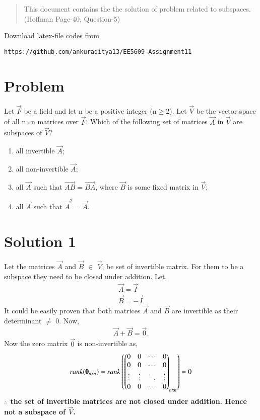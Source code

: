 \documentclass[journal,12pt,twocolumn]{IEEEtran}
\begin{document}
\begin{abstract}
This document contains the the solution of problem related to subspaces.(Hoffman Page-40, Question-5)  
\end{abstract}
Download latex-file codes from 
\begin{lstlisting}
https://github.com/ankuraditya13/EE5609-Assignment11
\end{lstlisting}

\section{Problem}
Let $\vec{F}$ be a field and let n be a positive integer (n$\geq$2). Let $\vec{V}$ be the vector space of all n$\times$n matrices over $\vec{F}$. Which of the following set of matrices $\vec{A}$ in $\vec{V}$ are subspaces of   $\vec{V}$?
\begin{enumerate}
\item all invertible $\vec{A}$;
\item all non-invertible $\vec{A}$;
\item all $\vec{A}$ such that $\vec{AB}=\vec{BA}$, where $\vec{B}$ is some fixed matrix in $\vec{V}$;
\item all $\vec{A}$ such that $\vec{A}^2 = \vec{A}$.
\end{enumerate}
\section{Solution 1}
Let the matrices $\vec{A}$ and $\vec{B}$ $\in$ $\vec{V}$, be set of invertible matrix. For them to be a subspace they need to be closed under addition.
Let,
\begin{align}
\vec{A} = \vec{I}\\
\vec{B} = -\vec{I}
\end{align}  
It could be easily proven that both matrices $\vec{A}$ and $\vec{B}$ are invertible as their determinant $\neq$ 0. Now,
\begin{align}
\vec{A}+\vec{B} = \vec{0}. 
\end{align} 
Now the zero matrix $\vec{0}$ is non-invertible as,
\begin{align}
rank(\mathbf{0}_{nxn}) = rank\left(\begin{pmatrix}0&0&\cdots&0\\0&0&\cdots&0\\\vdots&\vdots&\ddots&\vdots\\0&0&\cdots&0\end{pmatrix}_{nxn}\right)= 0
\end{align} 
\textbf{$\therefore$ the set of invertible matrices are not closed under addition. Hence not a subspace of $\vec{V}$.}
\end{document}
